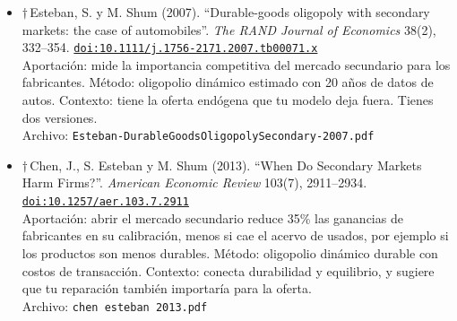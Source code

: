 \documentclass[11pt]{article}
\begin{document}
\begin{itemize}
{\footnotesize Archivo: \texttt{Gavazza-QuantitativeAnalysisUsedCar-2014.pdf}}
\item $\dagger$\,Esteban, S. y M. Shum (2007). ``Durable-goods oligopoly with secondary markets: the case of automobiles''. \textit{The RAND Journal of Economics} 38(2), 332--354. \href{https://doi.org/10.1111/j.1756-2171.2007.tb00071.x}{\texttt{doi:10.1111/j.1756-2171.2007.tb00071.x}}\\
Aportación: mide la importancia competitiva del mercado secundario para los fabricantes. Método: oligopolio dinámico estimado con 20 años de datos de autos. Contexto: tiene la oferta endógena que tu modelo deja fuera. Tienes dos versiones.\\
{\footnotesize Archivo: \texttt{Esteban-DurableGoodsOligopolySecondary-2007.pdf}}
\item $\dagger$\,Chen, J., S. Esteban y M. Shum (2013). ``When Do Secondary Markets Harm Firms?''. \textit{American Economic Review} 103(7), 2911--2934. \href{https://doi.org/10.1257/aer.103.7.2911}{\texttt{doi:10.1257/aer.103.7.2911}}\\
Aportación: abrir el mercado secundario reduce 35\% las ganancias de fabricantes en su calibración, menos si cae el acervo de usados, por ejemplo si los productos son menos durables. Método: oligopolio dinámico durable con costos de transacción. Contexto: conecta durabilidad y equilibrio, y sugiere que tu reparación también importaría para la oferta.\\
{\footnotesize Archivo: \texttt{chen esteban 2013.pdf}}
\end{itemize}
\end{document}
